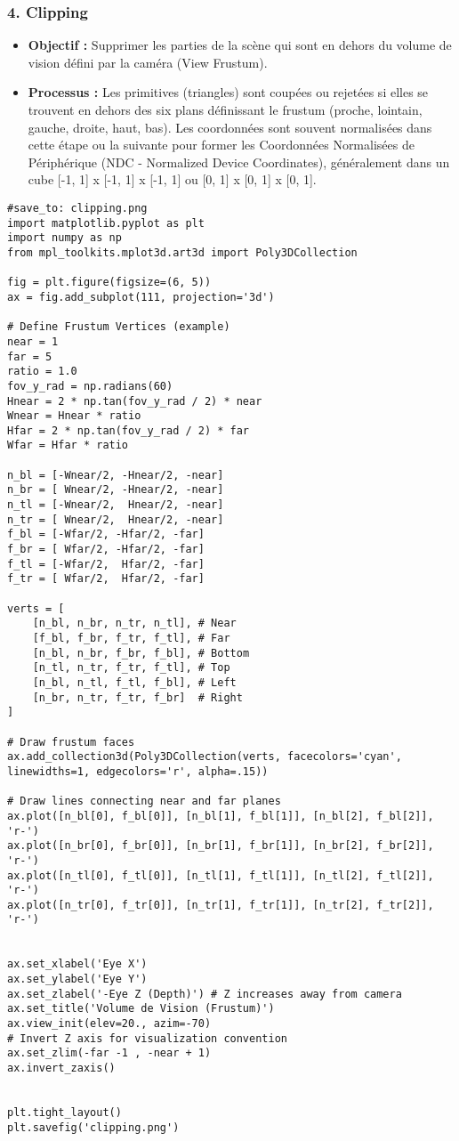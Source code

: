 \documentclass{article}
\begin{document}
\subsubsection{4. Clipping}
\begin{itemize}
    \item \textbf{Objectif :} Supprimer les parties de la scène qui sont en dehors du volume de vision défini par la caméra (View Frustum).
    \item \textbf{Processus :} Les primitives (triangles) sont coupées ou rejetées si elles se trouvent en dehors des six plans définissant le frustum (proche, lointain, gauche, droite, haut, bas). Les coordonnées sont souvent normalisées dans cette étape ou la suivante pour former les Coordonnées Normalisées de Périphérique (NDC - Normalized Device Coordinates), généralement dans un cube [-1, 1] x [-1, 1] x [-1, 1] ou [0, 1] x [0, 1] x [0, 1].
\end{itemize}

\begin{verbatim}
#save_to: clipping.png
import matplotlib.pyplot as plt
import numpy as np
from mpl_toolkits.mplot3d.art3d import Poly3DCollection

fig = plt.figure(figsize=(6, 5))
ax = fig.add_subplot(111, projection='3d')

# Define Frustum Vertices (example)
near = 1
far = 5
ratio = 1.0
fov_y_rad = np.radians(60)
Hnear = 2 * np.tan(fov_y_rad / 2) * near
Wnear = Hnear * ratio
Hfar = 2 * np.tan(fov_y_rad / 2) * far
Wfar = Hfar * ratio

n_bl = [-Wnear/2, -Hnear/2, -near]
n_br = [ Wnear/2, -Hnear/2, -near]
n_tl = [-Wnear/2,  Hnear/2, -near]
n_tr = [ Wnear/2,  Hnear/2, -near]
f_bl = [-Wfar/2, -Hfar/2, -far]
f_br = [ Wfar/2, -Hfar/2, -far]
f_tl = [-Wfar/2,  Hfar/2, -far]
f_tr = [ Wfar/2,  Hfar/2, -far]

verts = [
    [n_bl, n_br, n_tr, n_tl], # Near
    [f_bl, f_br, f_tr, f_tl], # Far
    [n_bl, n_br, f_br, f_bl], # Bottom
    [n_tl, n_tr, f_tr, f_tl], # Top
    [n_bl, n_tl, f_tl, f_bl], # Left
    [n_br, n_tr, f_tr, f_br]  # Right
]

# Draw frustum faces
ax.add_collection3d(Poly3DCollection(verts, facecolors='cyan', linewidths=1, edgecolors='r', alpha=.15))

# Draw lines connecting near and far planes
ax.plot([n_bl[0], f_bl[0]], [n_bl[1], f_bl[1]], [n_bl[2], f_bl[2]], 'r-')
ax.plot([n_br[0], f_br[0]], [n_br[1], f_br[1]], [n_br[2], f_br[2]], 'r-')
ax.plot([n_tl[0], f_tl[0]], [n_tl[1], f_tl[1]], [n_tl[2], f_tl[2]], 'r-')
ax.plot([n_tr[0], f_tr[0]], [n_tr[1], f_tr[1]], [n_tr[2], f_tr[2]], 'r-')


ax.set_xlabel('Eye X')
ax.set_ylabel('Eye Y')
ax.set_zlabel('-Eye Z (Depth)') # Z increases away from camera
ax.set_title('Volume de Vision (Frustum)')
ax.view_init(elev=20., azim=-70)
# Invert Z axis for visualization convention
ax.set_zlim(-far -1 , -near + 1)
ax.invert_zaxis()


plt.tight_layout()
plt.savefig('clipping.png')
\end{verbatim}
\end{document}
